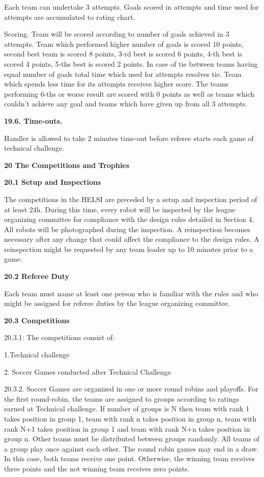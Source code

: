 \documentclass[a4paper]{article}
\begin{document}
Each team can undertake 3 attempts. Goals scored in attempts and time used for attempts are accumulated to rating chart.


Scoring. Team will be scored according to number of goals achieved in 3 attempts. Team which performed higher number of
goals is scored 10 points, second best team is scored 8 points, 3-rd best is scored 6 points, 4-th best is scored 4
points, 5-ths best is scored 2 points. In case of tie between teams having equal number of goals total time which used
for attempts resolves tie. Team which spends less time for its attempts receives higher score. The teams performing
6-ths or worse result are scored with 0 points as well as teams which couldn\textgreek{’}t achieve any goal and teams
which have given up from all 3 attempts.

\textbf{19.6. Time-outs. }

Handler is allowed to take 2 minutes time-out before referee starts each game of technical challenge.


\bigskip

\textbf{20 The Competitions and Trophies}

\textbf{20.1 Setup and Inspections}

The competitions in the HELSI are preceded by a setup and inspection period of at least 24h. During this time, every
robot will be inspected by the league organizing committee for compliance with the design rules detailed in Section 4.
All robots will be photographed during the inspection. A reinspection becomes necessary after any change that could
affect the compliance to the design rules. A reinspection might be requested by any team leader up to 10 minutes prior
to a game.

\textbf{20.2 Referee Duty}

Each team must name at least one person who is familiar with the rules and who might be assigned for referee duties by
the league organizing committee.

\textbf{20.3 Competitions}

20.3.1: The competitions consist of:

1.Technical challenge 

2. Soccer Games conducted after Technical Challenge

20.3.2. Soccer Games are organized in one or more round robins and playoffs. For the first round-robin, the teams are
assigned to groups according to ratings earned at Technical challenge. If number of groups is N then team with rank 1
takes position in group 1, team with rank n takes position in group n, team with rank N+1 takes position in group 1 and
team with rank N+n takes position in group n. Other teams must be distributed between groups randomly. All teams of a
group play once against each other. The round robin games may end in a draw. In this case, both teams receive one
point. Otherwise, the winning team receives three points and the not winning team receives zero points.
\end{document}
